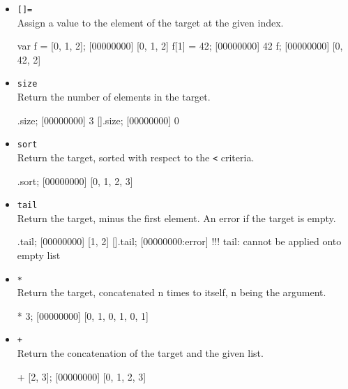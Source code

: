 \begin{itemize}
\item \lstinline|[]=|\\
\label{sec:std-list-setnth}
Assign a value to the element of the target at the given index.

\begin{urbiscript}[firstnumber=last]
var f = [0, 1, 2];
[00000000] [0, 1, 2]
f[1] = 42;
[00000000] 42
f;
[00000000] [0, 42, 2]
\end{urbiscript}

\item \lstinline|size|\\
Return the number of elements in the target.

\begin{urbiscript}[firstnumber=last]
[1, 2, 3].size;
[00000000] 3
[].size;
[00000000] 0
\end{urbiscript}

\item \lstinline|sort|\\
Return the target, sorted with respect to the \lstinline|<| criteria.

\begin{urbiscript}[firstnumber=last]
[1, 0, 3, 2].sort;
[00000000] [0, 1, 2, 3]
\end{urbiscript}

\item \lstinline|tail|\\
Return the target, minus the first element. An error if the target is
empty.

\begin{urbiscript}[firstnumber=last]
[0, 1, 2].tail;
[00000000] [1, 2]
[].tail;
[00000000:error] !!! tail: cannot be applied onto empty list
\end{urbiscript}

\item \lstinline|*|\\
Return the target, concatenated n times to itself, n being the
argument.

\begin{urbiscript}[firstnumber=last]
[0, 1] * 3;
[00000000] [0, 1, 0, 1, 0, 1]
\end{urbiscript}

\item \lstinline|+|\\
Return the concatenation of the target and the given list.

\begin{urbiscript}[firstnumber=last]
[0, 1] + [2, 3];
[00000000] [0, 1, 2, 3]
\end{urbiscript}


\end{itemize}
